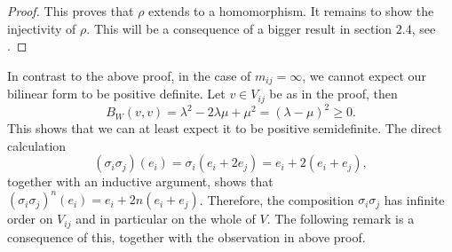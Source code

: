\begin{proof}

    This proves that \(\rho\) extends to a homomorphism.
    It remains to show the injectivity of \(\rho\).
    This will be a consequence of a bigger result in section \(2.4\), see .
\end{proof}

In contrast to the above proof, in the case of \(m_{ij} = \infty\), we cannot expect our bilinear form to be positive definite.
Let \(v \in V_{ij}\) be as in the proof, then
\[B_W(v,v) = \lambda^2 - 2\lambda\mu + \mu^2 = (\lambda - \mu)^2 \geq 0.\]
This shows that we can at least expect it to be positive semidefinite.
The direct calculation
\[(\sigma_i\sigma_j)(e_i) = \sigma_i(e_i + 2e_j) = e_i + 2(e_i + e_j),\]
together with an inductive argument, shows that \((\sigma_i\sigma_j)^n(e_i) = e_i + 2n(e_i + e_j)\).
Therefore, the composition \(\sigma_i\sigma_j\) has infinite order on \(V_{ij}\) and in particular on the whole of \(V\).
The following remark is a consequence of this, together with the observation in above proof.

